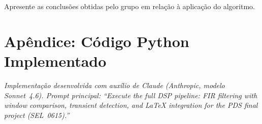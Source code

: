 \documentclass[conference]{IEEEtran}
\begin{document}
%
%
%

Apresente as conclusões obtidas pelo grupo em relação à aplicação do algoritmo.




\appendix

\section*{Apêndice: Código Python Implementado}

\textit{Implementação desenvolvida com auxílio de Claude (Anthropic, modelo Sonnet~4.6).
Prompt principal: ``Execute the full DSP pipeline: FIR filtering with window comparison, transient detection, and LaTeX integration for the PDS final project (SEL~0615).''}


\end{document}
